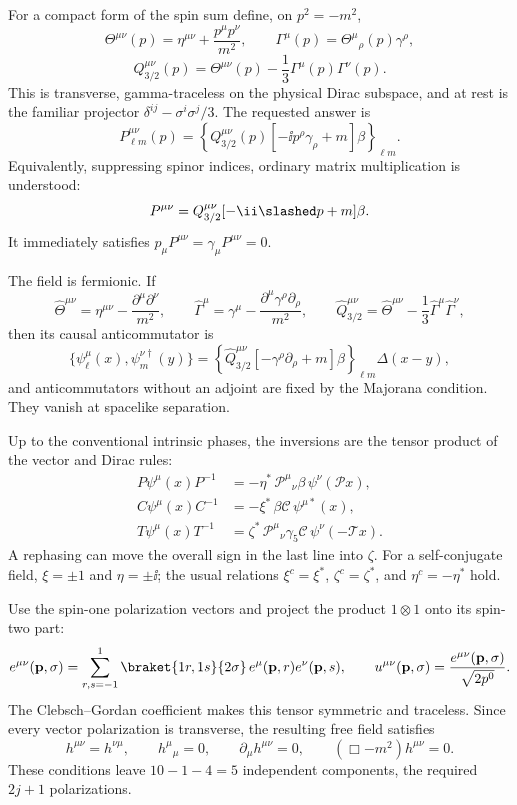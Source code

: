 \begin{enumerate}
For a compact form of the spin sum define, on \(p^2=-m^2\),
\[
 \Theta^{\mu\nu}(p)=\eta^{\mu\nu}+\frac{p^\mu p^\nu}{m^2},
 \qquad
 \Gamma^\mu(p)=\Theta^\mu{}_\rho(p)\gamma^\rho,
\]
\[
 Q_{3/2}^{\mu\nu}(p)=
 \Theta^{\mu\nu}(p)-\frac13\Gamma^\mu(p)\Gamma^\nu(p).
\]
This is transverse, gamma-traceless on the physical Dirac subspace, and at
rest is the familiar projector
\(\delta^{ij}-\sigma^i\sigma^j/3\).  The requested answer is
\[
 P_{\ell m}^{\mu\nu}(p)=
 \left\{
 Q_{3/2}^{\mu\nu}(p)
 [-\ii p^\rho\gamma_\rho+m]\beta
 \right\}_{\ell m}.
\]
Equivalently, suppressing spinor indices, ordinary matrix multiplication
is understood:
\[
 P^{\mu\nu}=Q_{3/2}^{\mu\nu}[-\ii\slashed p+m]\beta.
\]
It immediately satisfies
\(p_\mu P^{\mu\nu}=\gamma_\mu P^{\mu\nu}=0\).

The field is fermionic.  If
\[
 \widehat\Theta^{\mu\nu}
 =\eta^{\mu\nu}-\frac{\partial^\mu\partial^\nu}{m^2},
 \qquad
 \widehat\Gamma^\mu
 =\gamma^\mu-\frac{\partial^\mu\gamma^\rho\partial_\rho}{m^2},
 \qquad
 \widehat Q_{3/2}^{\mu\nu}
 =\widehat\Theta^{\mu\nu}
 -\frac13\widehat\Gamma^\mu\widehat\Gamma^\nu,
\]
then its causal anticommutator is
\[
 \{\psi^\mu_\ell(x),\psi^{\nu\dagger}_m(y)\}
 =
 \left\{\widehat Q_{3/2}^{\mu\nu}
 [-\gamma^\rho\partial_\rho+m]\beta\right\}_{\ell m}
 \Delta(x-y),
\]
and anticommutators without an adjoint are fixed by the Majorana condition.
They vanish at spacelike separation.

Up to the conventional intrinsic phases, the inversions are the tensor
product of the vector and Dirac rules:
\[
\begin{split}
 P\psi^\mu(x)P^{-1}
 &=-\eta^*\,\mathcal P^\mu{}_\nu\beta\,
   \psi^\nu(\mathcal P x),\\
 C\psi^\mu(x)C^{-1}
 &=-\xi^*\,\beta\mathcal C\,\psi^{\mu *}(x),\\
 T\psi^\mu(x)T^{-1}
 &=\zeta^*\,\mathcal P^\mu{}_\nu\gamma_5\mathcal C\,
   \psi^\nu(-\mathcal T x).
\end{split}
\]
A rephasing can move the overall sign in the last line into \(\zeta\).
For a self-conjugate field, \(\xi=\pm1\) and
\(\eta=\pm \ii\); the usual relations
\(\xi^c=\xi^*\), \(\zeta^c=\zeta^*\), and
\(\eta^c=-\eta^*\) hold.

Use the spin-one polarization vectors and project the product \(1\otimes1\)
onto its spin-two part:
\[
 e^{\mu\nu}(\mathbf p,\sigma)=
 \sum_{r,s=-1}^{1}\braket{1r,1s}{2\sigma}\,
 e^\mu(\mathbf p,r)e^\nu(\mathbf p,s),
 \qquad
 u^{\mu\nu}(\mathbf p,\sigma)=
 \frac{e^{\mu\nu}(\mathbf p,\sigma)}{\sqrt{2p^0}}.
\]
The Clebsch--Gordan coefficient makes this tensor symmetric and traceless.
Since every vector polarization is transverse, the resulting free field
satisfies
\[
 h^{\mu\nu}=h^{\nu\mu},\qquad
 h^\mu{}_\mu=0,\qquad
 \partial_\mu h^{\mu\nu}=0,\qquad
 (\Box-m^2)h^{\mu\nu}=0.
\]
These conditions leave \(10-1-4=5\) independent components, the required
\(2j+1\) polarizations.


\end{enumerate}
